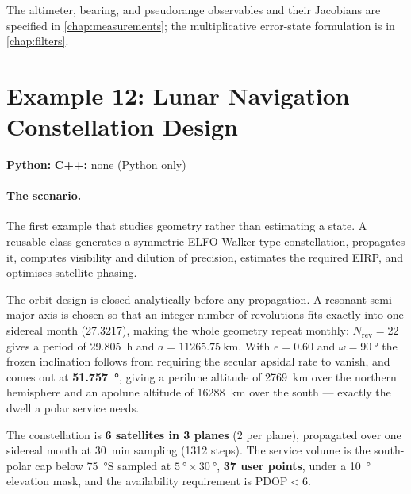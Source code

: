 The altimeter, bearing, and pseudorange observables and their Jacobians are
specified in \cref{chap:measurements}; the multiplicative error-state
formulation is in \cref{chap:filters}.

\section{Example 12: Lunar Navigation Constellation Design}
\label{sec:tut-ex12}

\textbf{Python:}  \quad
\textbf{C++:} none (Python only)

\paragraph{The scenario.}
The first example that studies geometry rather than estimating a state. A
reusable  class generates a symmetric ELFO
Walker-type constellation, propagates it, computes visibility and dilution of
precision, estimates the required EIRP, and optimises satellite phasing.

The orbit design is closed analytically before any propagation. A resonant
semi-major axis is chosen so that an integer number of revolutions fits exactly
into one sidereal month (\SI{27.3217}{\dayunit}), making the whole geometry
repeat monthly: \textbf{$N_\mathrm{rev}=22$} gives a period of
\SI{29.805}{\hour} and $a=\SI{11265.75}{\kilo\meter}$. With $e=0.60$ and
$\omega=\SI{90}{\degree}$ the frozen inclination follows from requiring the
secular apsidal rate to vanish, and comes out at
\textbf{\SI{51.757}{\degree}}, giving a perilune altitude of
\SI{2769}{\kilo\meter} over the northern hemisphere and an apolune altitude of
\SI{16288}{\kilo\meter} over the south --- exactly the dwell a polar service
needs.

The constellation is \textbf{6 satellites in 3 planes} (2 per plane), propagated
over one sidereal month at \SI{30}{\minute} sampling (1312 steps). The service
volume is the south-polar cap below \SI{75}{\degree}S sampled at
$\SI{5}{\degree}\times\SI{30}{\degree}$, \textbf{37 user points}, under a
\SI{10}{\degree} elevation mask, and the availability requirement is
$\mathrm{PDOP} < 6$.

